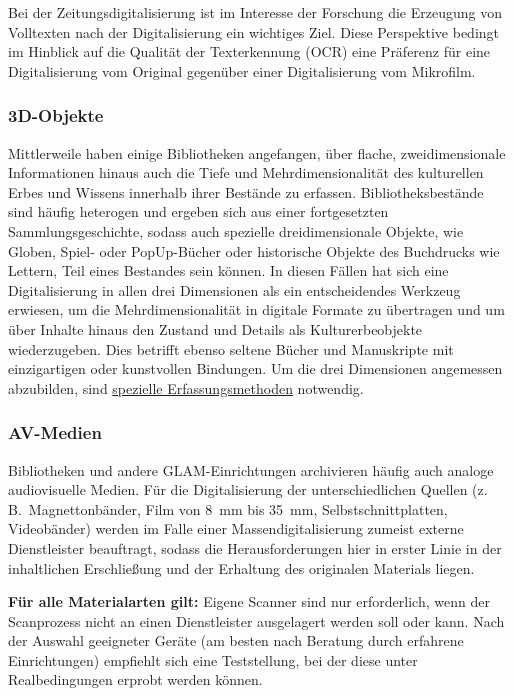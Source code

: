 \documentclass[
  11pt,
  letterpaper,
  DIV=11,
  twoside]{scrreprt}
\begin{document}
Bei der Zeitungsdigitalisierung ist im Interesse der Forschung die
Erzeugung von Volltexten nach der Digitalisierung ein wichtiges Ziel.
Diese Perspektive bedingt im Hinblick auf die Qualität der Texterkennung
(OCR) eine Präferenz für eine Digitalisierung vom Original gegenüber
einer Digitalisierung vom Mikrofilm.

\subsubsection{3D-Objekte}\label{d-objekte-1}

Mittlerweile haben einige Bibliotheken angefangen, über flache,
zweidimensionale Informationen hinaus auch die Tiefe und
Mehrdimensionalität des kulturellen Erbes und Wissens innerhalb ihrer
Bestände zu erfassen. Bibliotheksbestände sind häufig heterogen und
ergeben sich aus einer fortgesetzten Sammlungsgeschichte, sodass auch
spezielle dreidimensionale Objekte, wie Globen, Spiel- oder PopUp-Bücher
oder historische Objekte des Buchdrucks wie Lettern, Teil eines
Bestandes sein können. In diesen Fällen hat sich eine Digitalisierung in
allen drei Dimensionen als ein entscheidendes Werkzeug erwiesen, um die
Mehrdimensionalität in digitale Formate zu übertragen und um über
Inhalte hinaus den Zustand und Details als Kulturerbeobjekte
wiederzugeben. Dies betrifft ebenso seltene Bücher und Manuskripte mit
einzigartigen oder kunstvollen Bindungen. Um die drei Dimensionen
angemessen abzubilden, sind
\hyperref[scanner-und-scanverfahren]{spezielle Erfassungsmethoden}
notwendig.

\subsubsection{AV-Medien}\label{av-medien}

Bibliotheken und andere GLAM-Einrichtungen archivieren häufig auch
analoge audiovisuelle Medien. Für die Digitalisierung der
unterschiedlichen Quellen (z.\,B.~Magnettonbänder, Film von 8~mm bis
35~mm, Selbstschnittplatten, Videobänder) werden im Falle einer
Massendigitalisierung zumeist externe Dienstleister beauftragt, sodass
die Herausforderungen hier in erster Linie in der inhaltlichen
Erschließung und der Erhaltung des originalen Materials liegen.

\textbf{Für alle Materialarten gilt:} Eigene Scanner sind nur
erforderlich, wenn der Scanprozess nicht an einen Dienstleister
ausgelagert werden soll oder kann. Nach der Auswahl geeigneter Geräte
(am besten nach Beratung durch erfahrene Einrichtungen) empfiehlt sich
eine Teststellung, bei der diese unter Realbedingungen erprobt werden
können.
\end{document}
